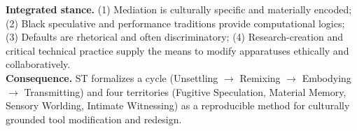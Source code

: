 \begin{itemize}[nosep]
	\textbf{Integrated stance.} (1) Mediation is culturally specific and materially encoded; (2) Black speculative and performance traditions provide computational logics; (3) Defaults are rhetorical and often discriminatory; (4) Research-creation and critical technical practice supply the means to modify apparatuses ethically and collaboratively. \\
	\textbf{Consequence.} ST formalizes a cycle (Unsettling $\rightarrow$ Remixing $\rightarrow$ Embodying $\rightarrow$ Transmitting) and four territories (Fugitive Speculation, Material Memory, Sensory Worlding, Intimate Witnessing) as a reproducible method for culturally grounded tool modification and redesign.	
\end{itemize}

